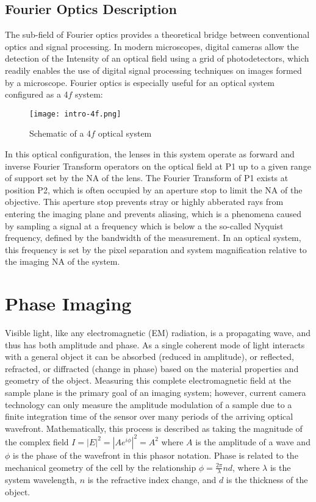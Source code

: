 \subsection{Fourier Optics Description}
The sub-field of Fourier optics provides a theoretical bridge between conventional optics and signal processing. In modern microscopes, digital cameras allow the detection of the Intensity of an optical field using a grid of photodetectors, which readily enables the use of digital signal processing techniques on images formed by a microscope. Fourier optics is especially useful for an optical system configured as a 4$f$ system:

\begin{figure}[tbh]
\centering
\texttt{[image: intro-4f.png]}
\caption{\label{fig:4f} Schematic of a 4$f$ optical system}
\end{figure}

In this optical configuration, the lenses in this system operate as forward and inverse Fourier Transform operators on the optical field at P1 up to a given range of support set by the NA of the lens. The Fourier Transform of P1 exists at position P2, which is often occupied by an aperture stop to limit the NA of the objective. This aperture stop prevents stray or highly abberated rays from entering the imaging plane and prevents aliasing, which is a phenomena caused by sampling a signal at a frequency which is below a the so-called Nyquist frequency, defined by the bandwidth of the measurement. In an optical system, this frequency is set by the pixel separation and system magnification relative to the imaging NA of the system.

\section{Phase Imaging}
Visible light, like any electromagnetic (EM) radiation, is a propagating wave, and thus has both amplitude and phase. As a single coherent mode of light interacts with a general object it can be absorbed (reduced in amplitude), or reflected, refracted, or diffracted (change in phase) based on the material properties and geometry of the object. Measuring this complete electromagnetic field at the sample plane is the primary goal of an imaging system; however, current camera technology can only measure the amplitude modulation of a sample due to a finite integration time of the sensor over many periods of the arriving optical wavefront. Mathematically, this process is described as taking the magnitude of the complex field $I =|E|^2 =|Ae^{i\phi}|^2 = A^2$ where $A$ is the amplitude of a wave and $\phi$ is the phase of the wavefront in this phasor notation. Phase is related to the mechanical geometry of the cell by the relationship $\phi = \frac{2\pi}{\lambda} n d$, where $\lambda$ is the system wavelength, $n$ is the refractive index change, and $d$ is the thickness of the object.


